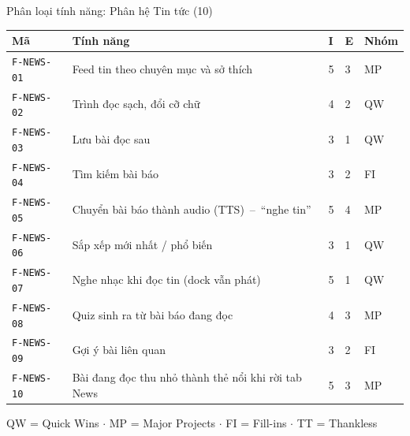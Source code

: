 \begin{frame}{Phân loại tính năng: Phân hệ Tin tức (10)}
\begin{center}\tiny
\begin{tabular}{@{}p{1.5cm}p{7.5cm}p{0.3cm}p{0.3cm}p{0.8cm}@{}}
\toprule
\textbf{Mã} & \textbf{Tính năng} & \textbf{I} & \textbf{E} & \textbf{Nhóm} \\
\midrule
\texttt{F-NEWS-01} & Feed tin theo chuyên mục và sở thích & 5 & 3 & MP \\
\texttt{F-NEWS-02} & Trình đọc sạch, đổi cỡ chữ & 4 & 2 & QW \\
\texttt{F-NEWS-03} & Lưu bài đọc sau & 3 & 1 & QW \\
\texttt{F-NEWS-04} & Tìm kiếm bài báo & 3 & 2 & FI \\
\texttt{F-NEWS-05} & Chuyển bài báo thành audio (TTS)~--~``nghe tin'' & 5 & 4 & MP \\
\texttt{F-NEWS-06} & Sắp xếp mới nhất / phổ biến & 3 & 1 & QW \\
\texttt{F-NEWS-07} & Nghe nhạc khi đọc tin (dock vẫn phát) & 5 & 1 & QW \\
\texttt{F-NEWS-08} & Quiz sinh ra từ bài báo đang đọc & 4 & 3 & MP \\
\texttt{F-NEWS-09} & Gợi ý bài liên quan & 3 & 2 & FI \\
\texttt{F-NEWS-10} & Bài đang đọc thu nhỏ thành thẻ nổi khi rời tab News & 5 & 3 & MP \\
\bottomrule
\end{tabular}
\end{center}
\vfill
{\tiny\color{TextGray} QW = Quick Wins $\cdot$ MP = Major Projects $\cdot$ FI = Fill-ins $\cdot$ TT = Thankless}
\end{frame}

